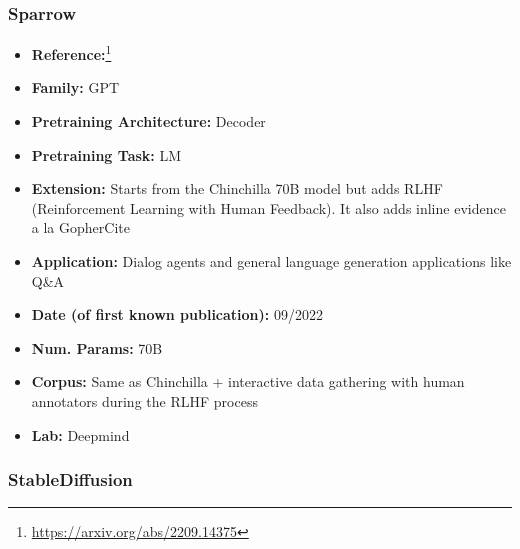 \documentclass{article}
\begin{document}
\subsubsection{Sparrow}

            \begin{itemize}
                \item \textbf{Reference:}\footnote{\url{https://arxiv.org/abs/2209.14375}}\cite{glaese2022improving}
                \item \textbf{Family:} GPT 
                \item \textbf{Pretraining Architecture:} Decoder
                \item \textbf{Pretraining Task:} LM
                \item \textbf{Extension:} Starts from the Chinchilla 70B model but adds RLHF (Reinforcement Learning with Human Feedback). It also adds inline evidence a la GopherCite  
                \item \textbf{Application:} Dialog agents and general language generation applications like Q\&A
                \item \textbf{Date (of first known publication):} 09/2022
                \item \textbf{Num. Params:} 70B
                \item \textbf{Corpus:} Same as Chinchilla + interactive data gathering with human annotators during the RLHF process
                \item \textbf{Lab:} Deepmind
            \end{itemize}
 
\subsubsection{StableDiffusion}
\end{document}
